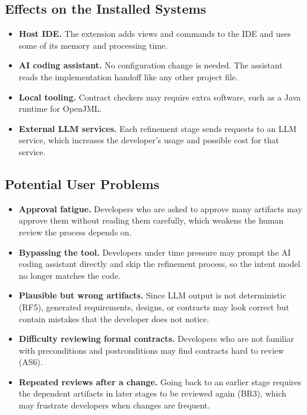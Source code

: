 \documentclass[12pt]{article}
\begin{document}
\subsection{Effects on the Installed Systems}

\begin{itemize}
  \item \textbf{Host IDE.} The extension adds views and commands to the IDE and
  uses some of its memory and processing time.
  \item \textbf{AI coding assistant.} No configuration change is needed. The
  assistant reads the implementation handoff like any other project file.
  \item \textbf{Local tooling.} Contract checkers may require extra software,
  such as a Java runtime for OpenJML.
  \item \textbf{External LLM services.} Each refinement stage sends requests to
  an LLM service, which increases the developer's usage and possible cost for
  that service.
\end{itemize}

\subsection{Potential User Problems}

\begin{itemize}
  \item \textbf{Approval fatigue.} Developers who are asked to approve many
  artifacts may approve them without reading them carefully, which weakens the
  human review the process depends on.
  \item \textbf{Bypassing the tool.} Developers under time pressure may prompt
  the AI coding assistant directly and skip the refinement process, so the
  intent model no longer matches the code.
  \item \textbf{Plausible but wrong artifacts.} Since LLM output is not
  deterministic (RF5), generated requirements, designs, or contracts may look
  correct but contain mistakes that the developer does not notice.
  \item \textbf{Difficulty reviewing formal contracts.} Developers who are not
  familiar with preconditions and postconditions may find contracts hard to
  review (AS6).
  \item \textbf{Repeated reviews after a change.} Going back to an earlier stage
  requires the dependent artifacts in later stages to be reviewed again (BR3),
  which may frustrate developers when changes are frequent.
\end{itemize}
\end{document}
